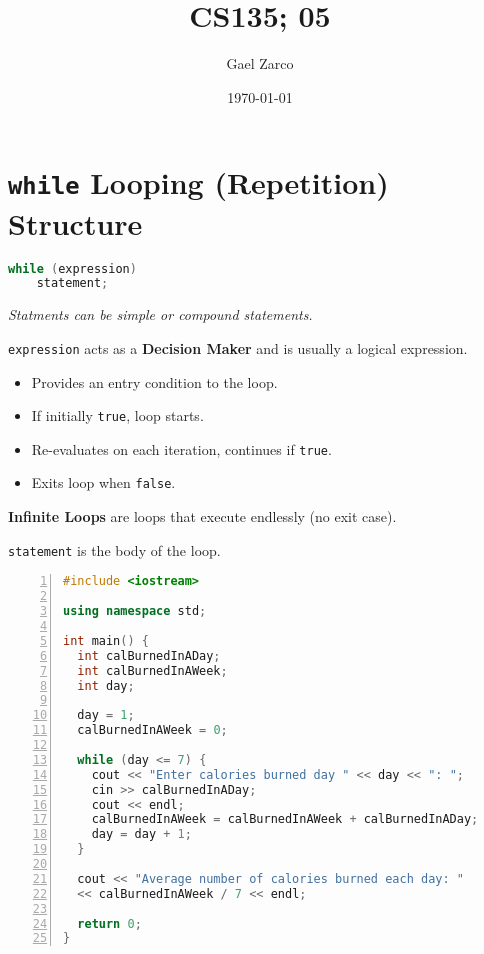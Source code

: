 \documentclass{article}
\title{CS135; 05}
\author{Gael Zarco}
\date{\today}
\begin{document}
\maketitle

\section{\texttt{while} Looping (Repetition) Structure}

\begin{lstlisting}[language=C++, caption={\texttt{while} Loop Syntax}]
while (expression)
	statement;
\end{lstlisting}
\textit{Statments can be simple or compound statements.}

\vspace{8pt}
\texttt{expression} acts as a \textbf{Decision Maker} and is usually a logical expression.
\begin{itemize}
    \item Provides an entry condition to the loop.
    \item If initially \texttt{true}, loop starts.
    \item Re-evaluates on each iteration, continues if \texttt{true}.
    \item Exits loop when \texttt{false}.
\end{itemize}

\textbf{Infinite Loops} are loops that execute endlessly (no exit case).

\vspace{8pt}
\texttt{statement} is the body of the loop.

\begin{lstlisting}[language=C++, caption={\texttt{while} Loop Example Program}, numbers=left]
#include <iostream>

using namespace std;

int main() {
  int calBurnedInADay;
  int calBurnedInAWeek;
  int day;

  day = 1;
  calBurnedInAWeek = 0;

  while (day <= 7) {
    cout << "Enter calories burned day " << day << ": ";
    cin >> calBurnedInADay;
    cout << endl;
    calBurnedInAWeek = calBurnedInAWeek + calBurnedInADay;
    day = day + 1;
  }
   
  cout << "Average number of calories burned each day: "
  << calBurnedInAWeek / 7 << endl;

  return 0;
}
\end{lstlisting}
\end{document}
